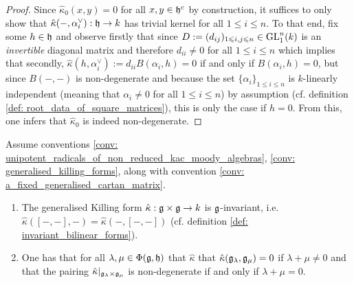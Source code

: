                 \begin{proof}
                    Since $\hat{\kappa}_0(x, y) = 0$ for all $x, y \in \mathfrak{h}^c$ by construction, it suffices to only show that $\hat{\kappa}(-, \alpha_i^{\vee}): \mathfrak{h} \to k$ has trivial kernel for all $1 \leq i \leq n$. To that end, fix some $h \in \mathfrak{h}$ and observe firstly that since $D := (d_{ij})_{1 \leqslant i, j \leqslant n} \in \mathrm{GL}_1^n(k)$ is an \textit{invertible} diagonal matrix and therefore $d_{ii} \not = 0$ for all $1 \leq i \leq n$ which implies that secondly, $\hat{\kappa}(h, \alpha_i^{\vee}) := d_{ii} B(\alpha_i, h) = 0$ if and only if $B(\alpha_i, h) = 0$, but since $B(-, -)$ is non-degenerate and because the set $\{\alpha_i\}_{1 \leq i \leq n}$ is $k$-linearly independent (meaning that $\alpha_i \not = 0$ for all $1 \leq i \leq n$) by assumption (cf. definition \ref{def: root_data_of_square_matrices}), this is only the case if $h = 0$. From this, one infers that $\hat{\kappa}_0$ is indeed non-degenerate.
                \end{proof}
            \begin{proposition} \label{prop: generalised_killing_forms_are_invariant}
                \cite[Theorem 2.2]{kac_infinite_dimensional_lie_algebras} Assume conventions \ref{conv: unipotent_radicals_of_non_reduced_kac_moody_algebras}, \ref{conv: generalised_killing_forms}, along with convention \ref{conv: a_fixed_generalised_cartan_matrix}.
                    \begin{enumerate}
                        \item The generalised Killing form $\hat{\kappa}: \g \x \g \to k$ is $\mathfrak{g}$-invariant, i.e. $\hat{\kappa}([-, -], -) = \hat{\kappa}(-, [-, -])$ (cf. definition \ref{def: invariant_bilinear_forms}).
                        \item One has that for all $\lambda, \mu \in \Phi(\mathfrak{g}, \mathfrak{h})$ that $\hat{\kappa}$ that $\hat{\kappa}(\mathfrak{g}_{\lambda}, \mathfrak{g}_{\mu}) = 0$ if $\lambda + \mu \not = 0$ and that the pairing $\hat{\kappa}|_{\g_{\lambda} \x \g_{\mu}}$ is non-degenerate if and only if $\lambda + \mu = 0$.
                    \end{enumerate}
            \end{proposition}
